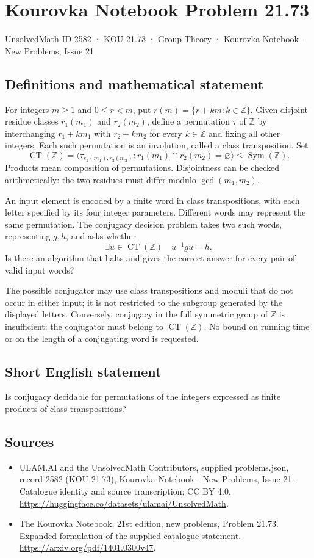 \documentclass[11pt,a4paper]{article}
\begin{document}
\section*{Kourovka Notebook Problem 21.73}\label{2582}
{\small UnsolvedMath ID 2582 · KOU-21.73 · Group Theory · Kourovka Notebook - New Problems, Issue 21}
\subsection{Definitions and mathematical statement}
For integers $m\ge1$ and $0\le r<m$, put
$r(m)=\{r+km:k\in\mathbb Z\}$. Given disjoint residue classes
$r_1(m_1)$ and $r_2(m_2)$, define a permutation $\tau$ of $\mathbb Z$
by interchanging $r_1+km_1$ with $r_2+km_2$ for every $k\in\mathbb Z$
and fixing all other integers. Each such permutation is an involution,
called a class transposition. Set
\[
 \operatorname{CT}(\mathbb Z)
  =\langle\tau_{r_1(m_1),r_2(m_2)}:
                      r_1(m_1)\cap r_2(m_2)=\varnothing\rangle
  \le\operatorname{Sym}(\mathbb Z).
\]
Products mean composition of permutations. Disjointness can be checked
arithmetically: the two residues must differ modulo
$\gcd(m_1,m_2)$.

An input element is encoded by a finite word in class transpositions,
with each letter specified by its four integer parameters. Different
words may represent the same permutation. The conjugacy decision
problem takes two such words, representing $g,h$, and asks whether
\[
 \exists u\in\operatorname{CT}(\mathbb Z)\quad u^{-1}gu=h.
\]
Is there an algorithm that halts and gives the correct answer for
every pair of valid input words?

The possible conjugator may use class transpositions and moduli that
do not occur in either input; it is not restricted to the subgroup
generated by the displayed letters. Conversely, conjugacy in the full
symmetric group of $\mathbb Z$ is insufficient: the conjugator must
belong to $\operatorname{CT}(\mathbb Z)$. No bound on running time or
on the length of a conjugating word is requested.
\subsection{Short English statement}
Is conjugacy decidable for permutations of the integers expressed as finite products of class transpositions?
\subsection{Sources}
\begin{itemize}
\item[S1] ULAM.AI and the UnsolvedMath Contributors, supplied problems.json, record 2582 (KOU-21.73), Kourovka Notebook - New Problems, Issue 21. Catalogue identity and source transcription; CC BY 4.0.
\url{https://huggingface.co/datasets/ulamai/UnsolvedMath}.
\item[S2] The Kourovka Notebook, 21st edition, new problems, Problem 21.73. Expanded formulation of the supplied catalogue statement.
\url{https://arxiv.org/pdf/1401.0300v47}.
\end{itemize}
\end{document}

